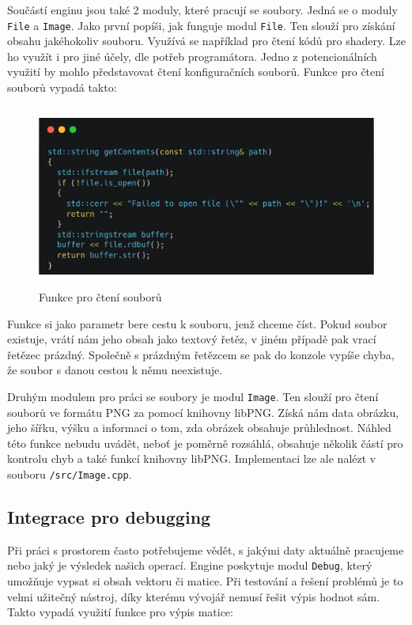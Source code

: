 \documentclass[12pt]{article}
\begin{document}
Součástí enginu jsou také 2 moduly, které pracují se soubory. Jedná se o moduly \texttt{File} a \texttt{Image}. Jako první popíši, jak funguje modul \texttt{File}. Ten slouží pro získání obsahu jakéhokoliv souboru. Využívá se například pro čtení kódů pro shadery. Lze ho využít i pro jiné účely, dle potřeb programátora. Jedno z potencionálních využití by mohlo představovat čtení konfiguračních souborů. Funkce pro čtení souborů vypadá takto:

\vspace{0.5cm}
\begin{figure}[!h]
    \centering
    \includegraphics[height=6cm]{images/file.png}
    \caption{Funkce pro čtení souborů}
    \label{fig:Funkce pro čtení souborů}
\end{figure}

Funkce si jako parametr bere cestu k souboru, jenž chceme číst. Pokud soubor existuje, vrátí nám jeho obsah jako textový řetěz, v jiném případě pak vrací řetězec prázdný. Společně s prázdným řetězcem se pak do konzole vypíše chyba, že soubor s danou cestou k němu neexistuje.

Druhým modulem pro práci se soubory je modul \texttt{Image}. Ten slouží pro čtení souborů ve formátu PNG za pomocí knihovny libPNG. Získá nám data obrázku, jeho šířku, výšku a informaci o tom, zda obrázek obsahuje průhlednost. Náhled této funkce nebudu uvádět, neboť je poměrně rozsáhlá, obsahuje několik částí pro kontrolu chyb a také funkcí knihovny libPNG. Implementaci lze ale nalézt v souboru \texttt{/src/Image.cpp}.

\subsection{Integrace pro debugging}

Při práci s prostorem často potřebujeme vědět, s jakými daty aktuálně pracujeme nebo jaký je výsledek našich operací. Engine poskytuje modul \texttt{Debug}, který umožňuje vypsat si obsah vektoru či matice. Při testování a řešení problémů je to velmi užitečný nástroj, díky kterému vývojář nemusí řešit výpis hodnot sám. Takto vypadá využití funkce pro výpis matice:
\end{document}
